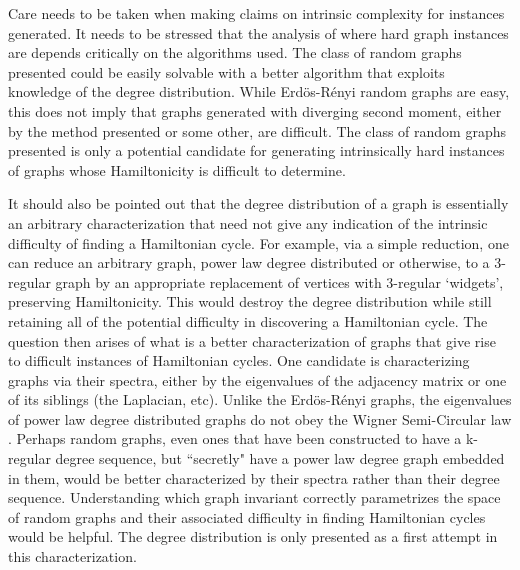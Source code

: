 \documentclass[twoside,11pt]{article}
\begin{document}


Care needs to be taken when making claims on intrinsic complexity for instances generated.  %
It needs to be stressed that the analysis of where hard graph instances are depends critically on the algorithms used.
The class of random graphs presented could
be easily solvable with a better algorithm that exploits knowledge of the degree distribution.
While Erd\"os-R\'enyi random graphs
are easy, this does not imply that graphs generated with diverging
second moment, either by the method presented or some other, are difficult.
The class of random graphs presented is only a potential candidate
for generating intrinsically hard instances of graphs
whose Hamiltonicity is difficult to determine.

It should also be pointed out that the degree distribution of a graph is essentially an arbitrary characterization that need
not give any indication of the intrinsic difficulty of finding a Hamiltonian cycle.  For example, via a simple reduction, one
can reduce an arbitrary graph, power law degree distributed or otherwise, to a 3-regular graph by an appropriate replacement of
vertices with 3-regular `widgets', preserving Hamiltonicity.
This would destroy the degree distribution while still retaining all of the potential difficulty
in discovering a Hamiltonian cycle.  The question then arises of what is a better characterization of graphs that give rise to difficult
instances of Hamiltonian cycles.  One candidate is characterizing graphs via their spectra, either by the eigenvalues of the adjacency
matrix or one of its siblings (the Laplacian, etc).  Unlike the Erd\"os-R\'enyi graphs, the eigenvalues of power law degree distributed
graphs do not obey the Wigner Semi-Circular law \cite{farkas,mihail_papadimitriou}.
Perhaps random graphs, even ones that have been constructed to have a k-regular
degree sequence, but ``secretly" have a power law degree graph embedded in them, would be better characterized by their spectra rather than
their degree sequence.  Understanding which graph invariant correctly parametrizes the space of random graphs and their associated
difficulty in finding Hamiltonian cycles would be helpful.  The degree distribution is only presented as a first attempt
in this characterization.
\end{document}
